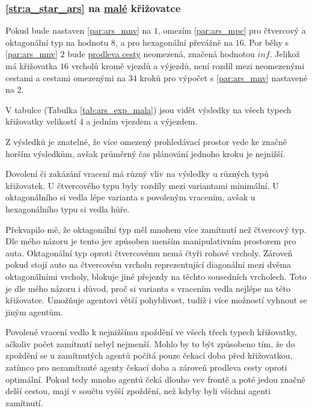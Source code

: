 \subsubsection{\ref{str:a_star_ars} na \hyperref[par:data_mala]{malé} křižovatce}
\label{subsubsec:exp_ars_mala_krizovatka}

Pokud bude nastaven \ref{par:ars_mnv} na $1$, omezím \ref{par:ars_mpc}
pro čtvercový a oktagonální typ na hodnotu $8$, a pro hexagonální převážně na $16$.
Por běhy s \ref{par:ars_mnv} $2$ bude \hyperref[par:ars_mpc]{prodleva cesty} neomezená, značená hodnotou $inf$.
Jelikož má křižovatka $16$ vrcholů kromě vjezdů a výjezdů, není rozdíl mezi neomezenými cestami a
cestami omezenými na $34$ kroků pro výpočet s \ref{par:ars_mnv} nastavené na $2$.

V tabulce (Tabulka \ref{tab:ars_exp_mala}) jsou vidět výsledky na všech typech křižovatky
velikostí $4$ a jedním vjezdem a výjezdem.



Z výsledků je znatelné, že více omezený prohledávací prostor vede ke značně horším výsledkům,
avšak průměrný čas plánování jednoho kroku je nejnižší.

Dovolení či zakázání vracení má různý vliv na výsledky u různých typů křižovatek.
U čtvercového typu byly rozdíly mezi variantami minimální.
U oktagonálního si vedla lépe varianta s povoleným vracením, avšak u hexagonálního typu si vedla hůře.

Překvapilo mě, že oktagonální typ měl mnohem více zamítnutí než čtvercový typ.
Dle mého názoru je tento jev způsoben menším manipulativním prostorem pro auta.
Oktagonální typ oproti čtvercovému nemá čtyři rohové vrcholy.
Zároveň pokud stojí auto na čtvercovém vrcholu reprezentující diagonální mezi dvěma oktagonálními vrcholy,
blokuje jiné přejezdy na těchto sousedních vrcholech. %
Toto je dle mého názoru i důvod, proč si varianta s vracením vedla nejlépe na této křižovatce.
Umožňuje agentovi větší pohyblivost, tudíž i více možností vyhnout se jiným agentům.

Povolené vracení vedlo k nejnižšímu zpoždění ve všech třech typech křižovatky, ačkoliv počet zamítnutí nebyl nejmenší.
Mohlo by to být způsobeno tím, že do zpoždění se u zamítnutých agentů počítá pouze čekací doba před křižovatkou,
zatímco pro nezamítnuté agenty čekací doba a zároveň prodleva cesty oproti optimální.
Pokud tedy mnoho agentů čeká dlouho vev frontě a poté jedou značně delší cestou, mají v součtu vyšší zpoždění,
než kdyby byli všichni agenti zamítnutí.

